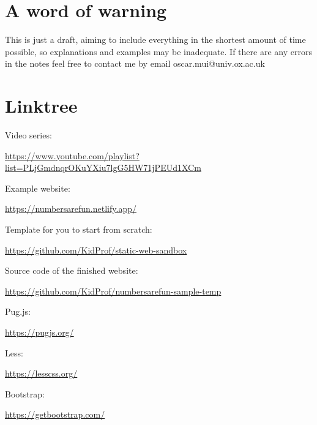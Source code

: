 \section{A word of warning}

This is just a draft, aiming to include everything in the shortest amount of time possible, so explanations and examples may be inadequate. If there are any errors in the notes feel free to contact me by email oscar.mui@univ.ox.ac.uk

\section{Linktree}

Video series:

\url{https://www.youtube.com/playlist?list=PLjGmdnqrOKuYXiu7lgG5HW71jPEUd1XCm}
\vspace{6mm}

Example website:

\url{https://numbersarefun.netlify.app/}
\vspace{6mm}

Template for you to start from scratch:

\url{https://github.com/KidProf/static-web-sandbox}
\vspace{6mm}

Source code of the finished website:

\url{https://github.com/KidProf/numbersarefun-sample-temp}
\vspace{6mm}

Pug.js: 

\url{https://pugjs.org/}
\vspace{6mm}

Less: 

\url{https://lesscss.org/}
\vspace{6mm}

Bootstrap: 

\url{https://getbootstrap.com/}
\vspace{6mm}

